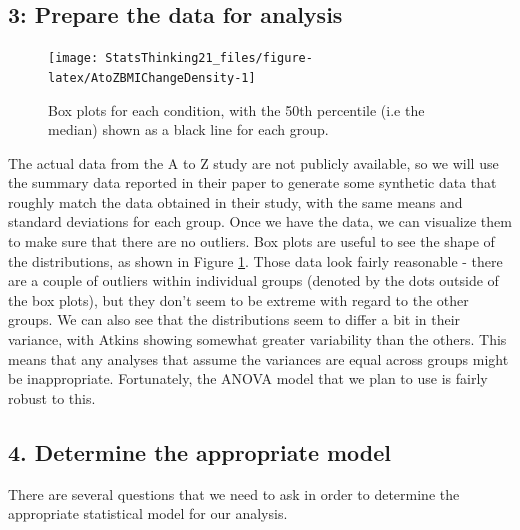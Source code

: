 \documentclass[12pt,]{book}
\theoremstyle{definition}
\theoremstyle{definition}
\theoremstyle{definition}
\theoremstyle{remark}
\begin{document}
\hypertarget{prepare-the-data-for-analysis}{%
\subsection{3: Prepare the data for analysis}\label{prepare-the-data-for-analysis}}

\begin{figure}
\texttt{[image: StatsThinking21\_files/figure-latex/AtoZBMIChangeDensity-1]} \caption{Box plots for each condition, with the 50th percentile (i.e the median) shown as a black line for each group.}\label{fig:AtoZBMIChangeDensity}
\end{figure}

The actual data from the A to Z study are not publicly available, so we will use the summary data reported in their paper to generate some synthetic data that roughly match the data obtained in their study, with the same means and standard deviations for each group. Once we have the data, we can visualize them to make sure that there are no outliers. Box plots are useful to see the shape of the distributions, as shown in Figure \ref{fig:AtoZBMIChangeDensity}. Those data look fairly reasonable - there are a couple of outliers within individual groups (denoted by the dots outside of the box plots), but they don't seem to be extreme with regard to the other groups. We can also see that the distributions seem to differ a bit in their variance, with Atkins showing somewhat greater variability than the others. This means that any analyses that assume the variances are equal across groups might be inappropriate. Fortunately, the ANOVA model that we plan to use is fairly robust to this.

\hypertarget{determine-the-appropriate-model}{%
\subsection{4. Determine the appropriate model}\label{determine-the-appropriate-model}}

There are several questions that we need to ask in order to determine the appropriate statistical model for our analysis.
\end{document}
